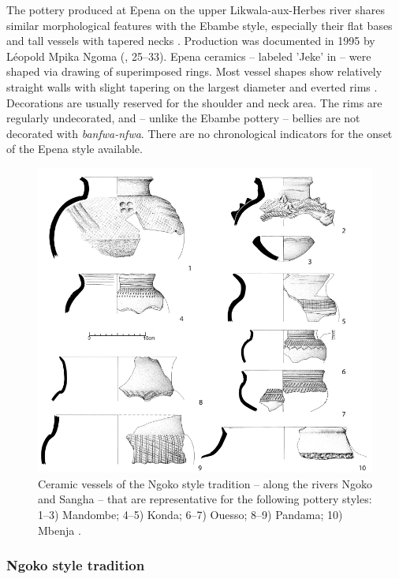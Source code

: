 \documentclass[smallextended,natbib]{svjour3}       %
\begin{document}
The pottery produced at Epena on the upper Likwala-aux-Herbes river shares similar morphological features with the Ebambe style, especially their flat bases and tall vessels with tapered necks \citep[Fig.~\ref{fig:sangha}.16--17;][137--141]{Seidensticker.2021e}. Production was documented in 1995 by Léopold Mpika Ngoma (\citeyear{MpikaNgoma.1996}, 25--33). Epena ceramics -- labeled 'Jeke' in \citet[119 Fig.~6.3]{Seidensticker.2016b} -- were shaped via drawing of superimposed rings. Most vessel shapes show relatively straight walls with slight tapering on the largest diameter and everted rims \citep[138 Fig.~60]{Seidensticker.2021e}. Decorations are usually reserved for the shoulder and neck area. The rims are regularly undecorated, and -- unlike the Ebambe pottery -- bellies are not decorated with \textit{banfwa-nfwa}. There are no chronological indicators for the onset of the Epena style available.

\begin{figure}[!tb]
	\centering
	\includegraphics[width=.6\textwidth]{Ngoko-Trad_Typen.pdf}
	\caption{Ceramic vessels of the Ngoko style tradition -- along the rivers Ngoko and Sangha -- that are representative for the following pottery styles: 1--3) Mandombe; 4--5) Konda; 6--7) Ouesso; 8--9) Pandama; 10) Mbenja \citep[145--162]{Seidensticker.2021e}.}
	\label{fig:ngoko}
\end{figure}

\subsubsection*{Ngoko style tradition}
\end{document}
